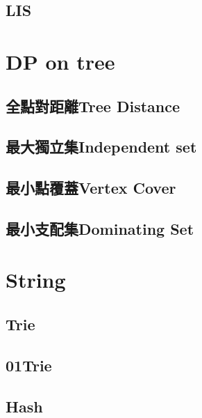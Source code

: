 \subsection{LIS}


\newpage

\section{DP on tree}

\subsection{全點對距離Tree Distance}


\subsection{最大獨立集Independent set}


\subsection{最小點覆蓋Vertex Cover}


\subsection{最小支配集Dominating Set}


\section{String}

\subsection{Trie}


\subsection{01Trie}


\subsection{Hash}


